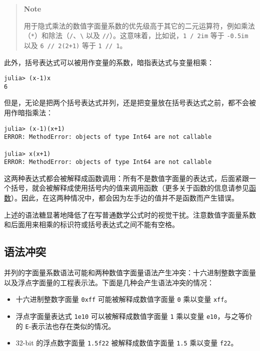 \begin{quote}
\textbf{Note}

用于隐式乘法的数值字面量系数的优先级高于其它的二元运算符，例如乘法（\texttt{*}）和除法（\texttt{/}、\texttt{{\textbackslash}} 以及 \texttt{//}）。这意味着，比如说，\texttt{1 / 2im} 等于 \texttt{-0.5im} 以及 \texttt{6 // 2(2+1)} 等于 \texttt{1 // 1}。

\end{quote}


此外，括号表达式可以被用作变量的系数，暗指表达式与变量相乘：




\begin{verbatim}
julia> (x-1)x
6
\end{verbatim}



但是，无论是把两个括号表达式并列，还是把变量放在括号表达式之前，都不会被用作暗指乘法：




\begin{verbatim}
julia> (x-1)(x+1)
ERROR: MethodError: objects of type Int64 are not callable

julia> x(x+1)
ERROR: MethodError: objects of type Int64 are not callable
\end{verbatim}



这两种表达式都会被解释成函数调用：所有不是数值字面量的表达式，后面紧跟一个括号，就会被解释成使用括号内的值来调用函数（更多关于函数的信息请参见\hyperlink{16900494992832782120}{函数}）。因此，在这两种情况中，都会因为左手边的值并不是函数而产生错误。



上述的语法糖显著地降低了在写普通数学公式时的视觉干扰。注意数值字面量系数和后面用来相乘的标识符或括号表达式之间不能有空格。



\hypertarget{5522643503764211248}{}


\subsection{语法冲突}



并列的字面量系数语法可能和两种数值字面量语法产生冲突：十六进制整数字面量以及浮点字面量的工程表示法。下面是几种会产生语法冲突的情况：



\begin{itemize}
\item 十六进制整数字面量 \texttt{0xff} 可能被解释成数值字面量 \texttt{0} 乘以变量 \texttt{xff}。


\item 浮点字面量表达式 \texttt{1e10} 可以被解释成数值字面量 \texttt{1} 乘以变量 \texttt{e10}，与之等价的 \texttt{E}-表示法也存在类似的情况。


\item 32-bit 的浮点数字面量 \texttt{1.5f22} 被解释成数值字面量 \texttt{1.5} 乘以变量 \texttt{f22}。

\end{itemize}


